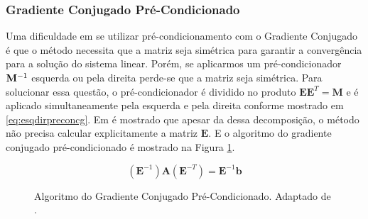 \subsubsection{Gradiente Conjugado Pré-Condicionado}


Uma dificuldade em se utilizar pré-condicionamento com o Gradiente Conjugado é que o método necessita que a matriz seja simétrica para garantir a convergência para a solução do sistema linear. Porém, se aplicarmos um pré-condicionador $\mathbf{M}^{-1}$ esquerda ou pela direita perde-se que a matriz seja simétrica. Para solucionar essa questão, o pré-condicionador é dividido no produto $\mathbf{E}\mathbf{E}^T = \mathbf{M}$ e é aplicado simultaneamente pela esquerda e pela direita conforme mostrado em \eqref{eq:esqdirpreconcg}. Em \citet{Shewchuk94anintroduction} é mostrado que apesar da dessa decomposição, o método não precisa calcular explicitamente a matriz $\mathbf{E}$. E o algoritmo do gradiente conjugado pré-condicionado é mostrado na Figura \ref{fig:algoritmocgprecon}.


\begin{equation} \label{eq:esqdirpreconcg}
(\mathbf{E}^{-1})\mathbf{A}(\mathbf{E}^{-T}) = \mathbf{E}^{-1}\mathbf{b}
\end{equation}



\begin{figure}
    \centering
\noindent{}
    \caption{Algoritmo do Gradiente Conjugado Pré-Condicionado. Adaptado de \citet{Shewchuk94anintroduction}. }
    \label{fig:algoritmocgprecon}

\end{figure}


